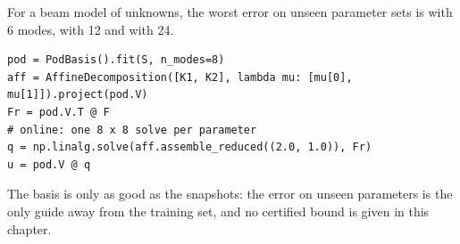 \newpage\thispagestyle{hl}
\par
{}
\begin{hlheadline}For a beam model of \cpdNFree{} unknowns, the worst error on \cpdNTest{} unseen parameter sets is \cpdGalerkinErrSix{} with 6 modes, \cpdGalerkinErrTwelve{} with 12 and \cpdGalerkinErrLast{} with 24.\end{hlheadline}
\begin{lstlisting}[style=hlpy]
pod = PodBasis().fit(S, n_modes=8)
aff = AffineDecomposition([K1, K2], lambda mu: [mu[0], mu[1]]).project(pod.V)
Fr = pod.V.T @ F
# online: one 8 x 8 solve per parameter
q = np.linalg.solve(aff.assemble_reduced((2.0, 1.0)), Fr)
u = pod.V @ q
\end{lstlisting}
\begin{hllimit}The basis is only as good as the snapshots: the error on unseen parameters is the only guide away from the training set, and no certified bound is given in this chapter.\end{hllimit}
